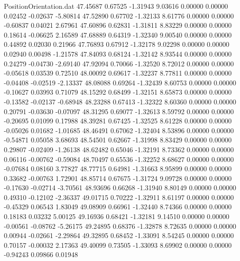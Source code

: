 \begin{filecontents}{PositionOrientation.dat}
  47.45687    0.67525   -1.31943     9.03616    0.00000    0.00000    0.02452   -0.02637   -5.80814
  47.52890    0.67702   -1.32133     8.61776    0.00000    0.00000   -0.60837    0.04021    2.67961
  47.60896    0.62831   -1.31811     8.83229    0.00000    0.00000    0.18614   -0.06625    2.16589
  47.68889    0.64319   -1.32340     9.00540    0.00000    0.00000    0.44892    0.02030    0.21966
  47.76893    0.67912   -1.32178     9.02298    0.00000    0.00000    0.02940    0.00498   -1.21578
  47.84093    0.68124   -1.32142     8.93544    0.00000    0.00000    0.24279   -0.04730   -2.69140
  47.92094    0.70066   -1.32520     8.72012    0.00000    0.00000   -0.05618    0.03539    0.72510
  48.00092    0.69617   -1.32237     8.77811    0.00000    0.00000   -0.04408   -0.02519   -2.13337
  48.08088    0.69264   -1.32439     8.60753    0.00000    0.00000   -0.10627    0.03993    0.71079
  48.15292    0.68499   -1.32151     8.65873    0.00000    0.00000   -0.13582   -0.02137   -0.68948
  48.23288    0.67413   -1.32322     8.60360    0.00000    0.00000    0.20791   -0.03630   -0.07097
  48.31295    0.69077   -1.32613     8.59792    0.00000    0.00000   -0.20695    0.01099    0.17988
  48.39281    0.67425   -1.32525     8.61228    0.00000    0.00000   -0.05026    0.01682   -1.01685
  48.46491    0.67062   -1.32404     8.53896    0.00000    0.00000   -0.54871    0.05058    3.68693
  48.54501    0.62667   -1.31998     8.83429    0.00000    0.00000    0.29807   -0.02409   -1.26138
  48.62482    0.65046   -1.32191     8.73362    0.00000    0.00000    0.06116   -0.00762   -0.59084
  48.70497    0.65536   -1.32252     8.68627    0.00000    0.00000   -0.07684    0.08160    3.77827
  48.77715    0.64981   -1.31663     8.95899    0.00000    0.00000    0.33682   -0.00763    1.72901
  48.85714    0.67675   -1.31724     9.09728    0.00000    0.00000   -0.17630   -0.02714   -3.70561
  48.93696    0.66268   -1.31940     8.80149    0.00000    0.00000    0.49310   -0.12102   -2.36337
  49.01715    0.70222   -1.32911     8.61197    0.00000    0.00000   -0.45329    0.06543    1.83049
  49.08909    0.66961   -1.32440     8.74366    0.00000    0.00000    0.18183    0.03232    5.00125
  49.16936    0.68421   -1.32181     9.14510    0.00000    0.00000   -0.00561   -0.08762   -5.26175
  49.24895    0.68376   -1.32878     8.72635    0.00000    0.00000    0.00944   -0.02661   -2.29864
  49.32895    0.68452   -1.33091     8.54245    0.00000    0.00000    0.70157   -0.00032    2.17363
  49.40099    0.73505   -1.33093     8.69902    0.00000    0.00000   -0.94243    0.09866    0.01948

\end{filecontents}
